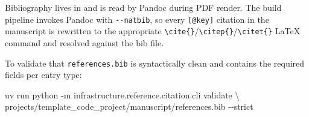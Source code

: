 \documentclass[
]{article}
\newenvironment{Shaded}{}{}
\newcommand{\AttributeTok}[1]{\textcolor[rgb]{0.49,0.56,0.16}{#1}}
\newcommand{\DataTypeTok}[1]{\textcolor[rgb]{0.56,0.13,0.00}{#1}}
\newcommand{\ExtensionTok}[1]{#1}
\newcommand{\NormalTok}[1]{#1}
\begin{document}
Bibliography lives in
\href{references.bib}{} and is read by
Pandoc during PDF render. The build pipeline invokes Pandoc with
\texttt{-\/-natbib}, so every \texttt{{[}@key{]}} citation in the
manuscript is rewritten to the appropriate
\texttt{\textbackslash{}cite\{\}}/\texttt{\textbackslash{}citep\{\}}/\texttt{\textbackslash{}citet\{\}}
LaTeX command and resolved against the bib file.

To validate that \texttt{references.bib} is syntactically clean and
contains the required fields per entry type:

\begin{Shaded}
\begin{Highlighting}[]
\ExtensionTok{uv}\NormalTok{ run python }\AttributeTok{{-}m}\NormalTok{ infrastructure.reference.citation.cli validate }\DataTypeTok{\textbackslash{}}
\NormalTok{    projects/template\_code\_project/manuscript/references.bib }\AttributeTok{{-}{-}strict}
\end{Highlighting}
\end{Shaded}




\clearpage


\end{document}
